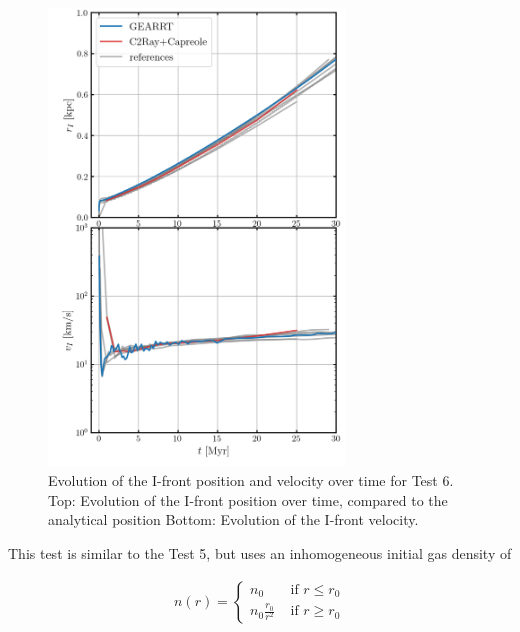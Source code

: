 \begin{figure}
\centering
\includegraphics[width=0.7\textwidth]{figures/RHD/Iliev6/ionization_fronts.png}
\caption{
 Evolution of the I-front position and velocity over time for Test 6.
 Top: Evolution of the I-front position over time, compared to the analytical position
 Bottom: Evolution of the I-front velocity.
}
\label{fig:iliev6-Ifront}
\end{figure}








This test is similar to the Test 5, but uses an inhomogeneous initial gas density of

\begin{align}
    n(r) = \begin{cases}
            n_0 & \text{ if } r \leq r_0 \\
            n_0 \frac{r_0}{r^2} & \text{ if } r \geq r_0
           \end{cases}
\end{align}


